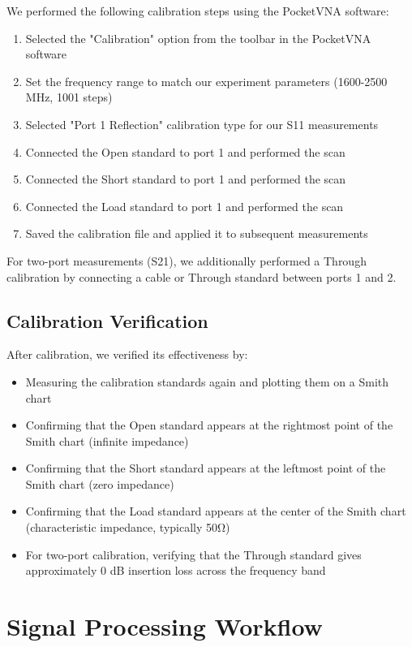 \documentclass[11pt,a4paper]{article}
\begin{document}
We performed the following calibration steps using the PocketVNA software:

\begin{enumerate}
    \item Selected the "Calibration" option from the toolbar in the PocketVNA software
    \item Set the frequency range to match our experiment parameters (1600-2500 MHz, 1001 steps)
    \item Selected "Port 1 Reflection" calibration type for our S11 measurements
    \item Connected the Open standard to port 1 and performed the scan
    \item Connected the Short standard to port 1 and performed the scan
    \item Connected the Load standard to port 1 and performed the scan
    \item Saved the calibration file and applied it to subsequent measurements
\end{enumerate}

For two-port measurements (S21), we additionally performed a Through calibration by connecting a cable or Through standard between ports 1 and 2.

\subsection{Calibration Verification}

After calibration, we verified its effectiveness by:

\begin{itemize}
    \item Measuring the calibration standards again and plotting them on a Smith chart
    \item Confirming that the Open standard appears at the rightmost point of the Smith chart (infinite impedance)
    \item Confirming that the Short standard appears at the leftmost point of the Smith chart (zero impedance)
    \item Confirming that the Load standard appears at the center of the Smith chart (characteristic impedance, typically 50Ω)
    \item For two-port calibration, verifying that the Through standard gives approximately 0 dB insertion loss across the frequency band
\end{itemize}

\section{Signal Processing Workflow}
\end{document}
